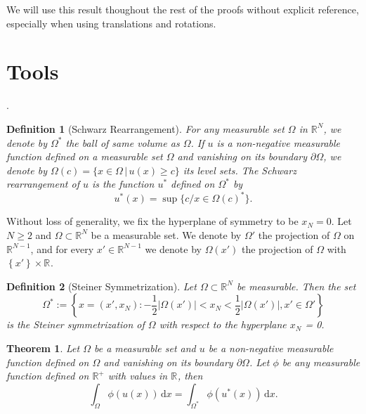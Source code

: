 \documentclass[12pt]{report}
\newtheorem{theorem}{Theorem}[section]
\newtheorem{definition}{Definition}
\numberwithin{definition}{section}
\begin{document}
We will use this result thoughout the rest of the proofs without explicit reference, especially when using translations and rotations.



\break


\section{Tools}

.

\begin{definition}[Schwarz Rearrangement] \label{schwarz}
  For any measurable set $\Omega$ in $\mathbb{R}^{N} $, we denote by $\Omega^{*}$ the ball of same volume as $\Omega$.
  If $u$ is a non-negative measurable function defined on a measurable set $\Omega$ and vanishing on its boundary $\partial \Omega$,
  we denote by $\Omega(c) = \{ x \in \Omega \,|\, u(x) \geq c \}$ its level sets.
  The Schwarz rearrangement of $u$ is the function $u^{*}$ defined on $\Omega^{*}$ by 
  \[
    u^{*}(x) = \sup\{c / x \in \Omega(c)^{*}\}
  .\] 
  
\end{definition}

Without loss of generality, we fix the hyperplane of symmetry to be $x_{N} = 0$.
Let $N \geq 2$ and $\Omega \subset \mathbb{R}^{N} $ be a measurable set.
We denote by $\Omega'$ the projection of $\Omega$ on $\mathbb{R}^{N-1} $, and for every $x' \in \mathbb{R}^{N-1} $ we denote by $\Omega(x')$ the projection of $\Omega$ with $ \left\{ x' \right\} \times \mathbb{R}^{}  $.

\begin{definition}[Steiner Symmetrization] \label{steiner}
Let $\Omega \subset \mathbb{R}^{N} $ be measurable.
Then the set 
\[
\Omega^{*} := \left\{ x = (x', x_{N}) : - \frac{1}{2} |\Omega(x')| < x_{N} < \frac{1}{2} |\Omega(x')|, x' \in \Omega' \right\} 
\] 
is the Steiner symmetrization of $\Omega$ with respect to the hyperplane $x_{N}$ = 0.
\end{definition}


\begin{theorem} \label {fk1}
 Let $\Omega$ be a measurable set and $u$ be a non-negative measurable function defined on $\Omega$ and vanishing on its boundary $\partial  \Omega$. 
 Let $\phi$ be any measurable function defined on $\mathbb{R}^{+} $ with values in $\mathbb{R}^{} $, then
 \[
   \int_\Omega \! \phi(u(x)) \, \mathrm{d}x = \int_{\Omega^*} \! \phi(u^*(x)) \, \mathrm{d}x  
 .\] 
\end{theorem}
\end{document}
